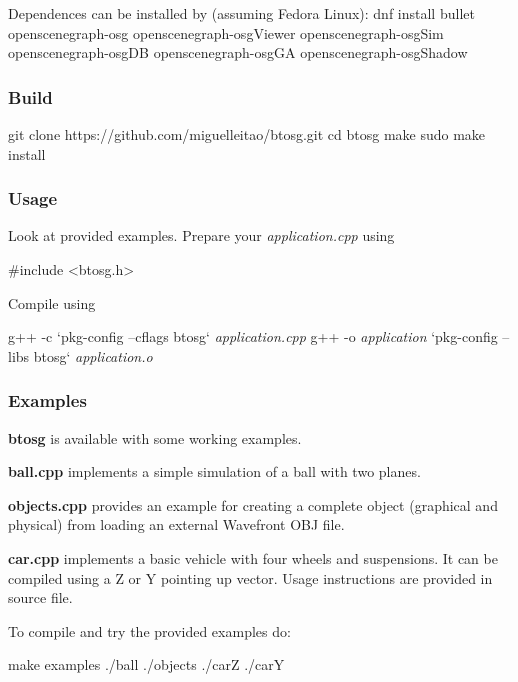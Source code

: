 Dependences can be installed by (assuming Fedora Linux)\+: dnf install bullet openscenegraph-\/osg openscenegraph-\/osg\+Viewer openscenegraph-\/osg\+Sim openscenegraph-\/osg\+DB openscenegraph-\/osg\+GA openscenegraph-\/osg\+Shadow

\subsubsection*{Build}

\begin{DoxyVerb}git clone https://github.com/miguelleitao/btosg.git
cd btosg
make
sudo make install
\end{DoxyVerb}


\subsubsection*{Usage}

Look at provided examples. Prepare your {\itshape application.\+cpp} using \begin{DoxyVerb}#include <btosg.h>
\end{DoxyVerb}


Compile using 
\begin{DoxyPre}
g++ -c `pkg-config --cflags btosg` {\itshape application.cpp}
g++ -o {\itshape application} `pkg-config --libs btosg` {\itshape application.o}
\end{DoxyPre}
 \subsubsection*{Examples}

{\bfseries btosg} is available with some working examples.
\begin{DoxyItemize}
\item {\bfseries ball.\+cpp} implements a simple simulation of a ball with two planes.
\item {\bfseries objects.\+cpp} provides an example for creating a complete object (graphical and physical) from loading an external Wavefront O\+BJ file.
\item {\bfseries car.\+cpp} implements a basic vehicle with four wheels and suspensions. It can be compiled using a Z or Y pointing up vector. Usage instructions are provided in source file.
\end{DoxyItemize}

To compile and try the provided examples do\+: \begin{DoxyVerb}make examples 
./ball
./objects
./carZ
./carY\end{DoxyVerb}
 
